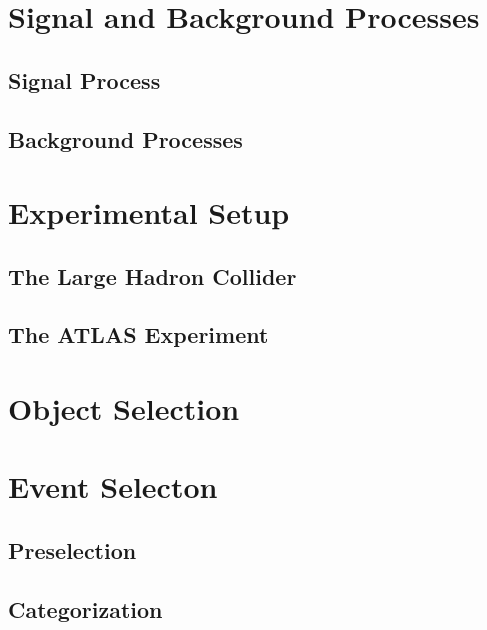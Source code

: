\documentclass[12pt,a4paper,openright]{scrreprt}
\begin{document}
\chapter{Signal and Background Processes}
\label{cha:signal_and_background_processes}

\section{Signal Process}
\label{sec:signal_process}

\section{Background Processes}
\label{sec:background_processes}

\chapter{Experimental Setup}
\label{cha:experimental_setup}

\section{The Large Hadron Collider}
\label{sec:the_large_hadron_collider}

\section{The ATLAS Experiment}
\label{sec:the_atlas_experiment}

\chapter{Object Selection}
\label{cha:object_selection}

\chapter{Event Selecton}
\label{cha:event_selecton}

\section{Preselection}
\label{sec:preselection}

\section{Categorization}
\label{sec:categorization}
\end{document}
